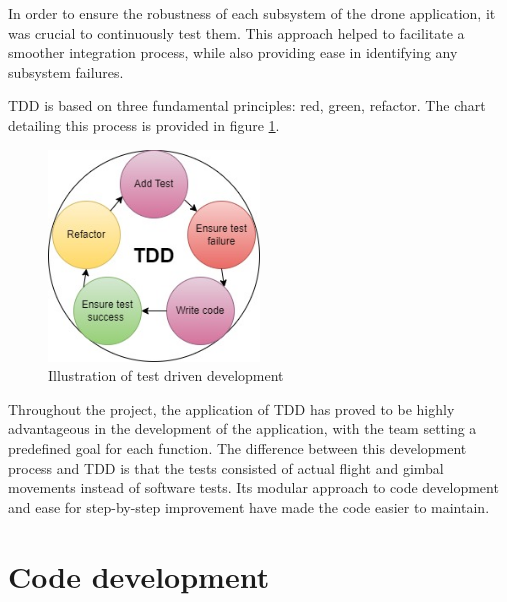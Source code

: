 In order to ensure the robustness of each subsystem of the drone application, it was crucial to continuously test them. This approach helped to facilitate a smoother integration process, while also providing ease in identifying any subsystem failures.

TDD is based on three fundamental principles: red, green, refactor. The chart detailing this process is provided in figure \ref{fig:TDD}. 
\\

\begin{figure}[H]
  \centering
  \includegraphics[width=0.5\textwidth]{figure/TDD.jpg}
  \caption{Illustration of test driven development}
  \label{fig:TDD}
\end{figure}

Throughout the project, the application of TDD has proved to be highly advantageous in the development of the application, with the team setting a predefined goal for each function. The difference between this development process and TDD is that the tests consisted of actual flight and gimbal movements instead of software tests. Its modular approach to code development and ease for step-by-step improvement have made the code easier to maintain. 

\section{Code development}


